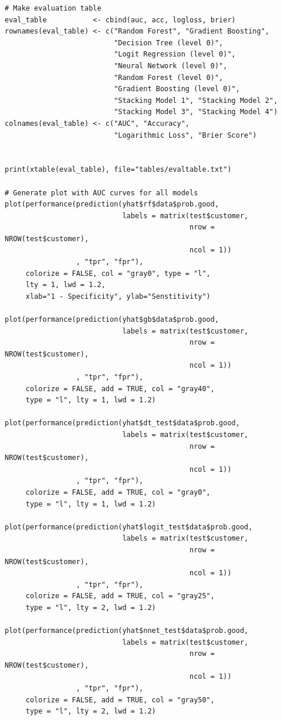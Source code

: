 \documentclass[12pt]{article}
\begin{document}
\begin{lstlisting}
# Make evaluation table
eval_table           <- cbind(auc, acc, logloss, brier)
rownames(eval_table) <- c("Random Forest", "Gradient Boosting", 
                          "Decision Tree (level 0)", 
                          "Logit Regression (level 0)",
                          "Neural Network (level 0)", 
                          "Random Forest (level 0)", 
                          "Gradient Boosting (level 0)",
                          "Stacking Model 1", "Stacking Model 2", 
                          "Stacking Model 3", "Stacking Model 4")
colnames(eval_table) <- c("AUC", "Accuracy", 
                          "Logarithmic Loss", "Brier Score")


print(xtable(eval_table), file="tables/evaltable.txt")

# Generate plot with AUC curves for all models
plot(performance(prediction(yhat$rf$data$prob.good, 
                            labels = matrix(test$customer, 
                                            nrow = NROW(test$customer), 
                                            ncol = 1))
                 , "tpr", "fpr"),
     colorize = FALSE, col = "gray0", type = "l",
     lty = 1, lwd = 1.2,
     xlab="1 - Specificity", ylab="Senstitivity")

plot(performance(prediction(yhat$gb$data$prob.good, 
                            labels = matrix(test$customer, 
                                            nrow = NROW(test$customer), 
                                            ncol = 1))
                 , "tpr", "fpr"),
     colorize = FALSE, add = TRUE, col = "gray40",
     type = "l", lty = 1, lwd = 1.2)

plot(performance(prediction(yhat$dt_test$data$prob.good, 
                            labels = matrix(test$customer, 
                                            nrow = NROW(test$customer), 
                                            ncol = 1))
                 , "tpr", "fpr"),
     colorize = FALSE, add = TRUE, col = "gray0",
     type = "l", lty = 1, lwd = 1.2)

plot(performance(prediction(yhat$logit_test$data$prob.good, 
                            labels = matrix(test$customer, 
                                            nrow = NROW(test$customer), 
                                            ncol = 1))
                 , "tpr", "fpr"),
     colorize = FALSE, add = TRUE, col = "gray25", 
     type = "l", lty = 2, lwd = 1.2)

plot(performance(prediction(yhat$nnet_test$data$prob.good, 
                            labels = matrix(test$customer, 
                                            nrow = NROW(test$customer), 
                                            ncol = 1))
                 , "tpr", "fpr"),
     colorize = FALSE, add = TRUE, col = "gray50", 
     type = "l", lty = 2, lwd = 1.2)


\end{lstlisting}
\end{document}
